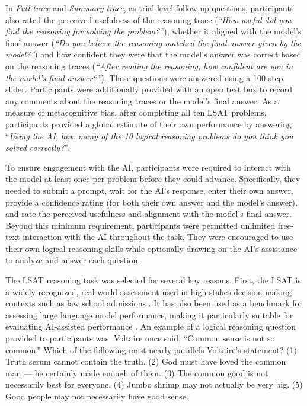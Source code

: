 \documentclass[manuscript,review,anonymous]{acmart}
\begin{document}
In \textit{Full-trace} and \textit{Summary-trace}, as trial-level follow-up questions, participants also rated the perceived usefulness of the reasoning trace (\textit{``How useful did you find the reasoning for solving the problem?''}), whether it aligned with the model's final answer (\textit{``Do you believe the reasoning matched the final answer given by the model?''}) and how confident they were that the model's answer was correct based on the reasoning traces (\textit{``After reading the reasoning, how confident are you in the model's final answer?''}). These questions were answered using a 100-step slider. Participants were additionally provided with an open text box to record any comments about the reasoning traces or the model's final answer. As a measure of metacognitive bias, after completing all ten LSAT problems, participants provided a global estimate of their own performance by answering ``\textit{Using the AI, how many of the 10 logical reasoning problems do you think you solved correctly?}''.

To ensure engagement with the AI, participants were required to interact with the model at least once per problem before they could advance. Specifically, they needed to submit a prompt, wait for the AI's response, enter their own answer, provide a confidence rating (for both their own answer and the model's answer), and rate the perceived usefulness and alignment with the model's final answer. Beyond this minimum requirement, participants were permitted unlimited free-text interaction with the AI throughout the task. They were encouraged to use their own logical reasoning skills while optionally drawing on the AI's assistance to analyze and answer each question.

The LSAT reasoning task was selected for several key reasons. First, the LSAT is a widely recognized, real-world assessment used in high-stakes decision-making contexts such as law school admissions \cite{shultz2011predicting,wainer1995precision}. It has also been used as a benchmark for assessing large language model performance, making it particularly suitable for evaluating AI-assisted performance \cite{katz2024gpt}. An example of a logical reasoning question provided to participants was: Voltaire once said, ``Common sense is not so common.'' Which of the following most nearly parallels Voltaire's statement? (1) Truth serum cannot contain the truth. (2) God must have loved the common man --- he certainly made enough of them. (3) The common good is not necessarily best for everyone. (4) Jumbo shrimp may not actually be very big. (5) Good people may not necessarily have good sense.
\end{document}
